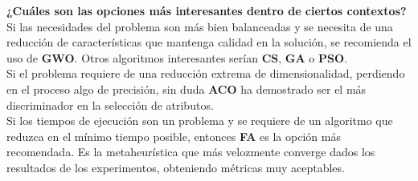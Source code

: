 \textbf{¿Cuáles son las opciones más interesantes dentro de ciertos contextos?} Si las necesidades del problema son más bien balanceadas y se necesita de una reducción de características que mantenga calidad en la solución, se recomienda el uso de \textbf{GWO}. Otros algoritmos interesantes serían \textbf{CS}, \textbf{GA} o \textbf{PSO}.\\[6pt]
Si el problema requiere de una reducción extrema de dimensionalidad, perdiendo en el proceso algo de precisión, sin duda \textbf{ACO} ha demostrado ser el más discriminador en la selección de atributos.\\[6pt]
Si los tiempos de ejecución son un problema y se requiere de un algoritmo que reduzca en el mínimo tiempo posible, entonces \textbf{FA} es la opción más recomendada. Es la metaheurística que más velozmente converge dados los resultados de los experimentos, obteniendo métricas muy aceptables.
